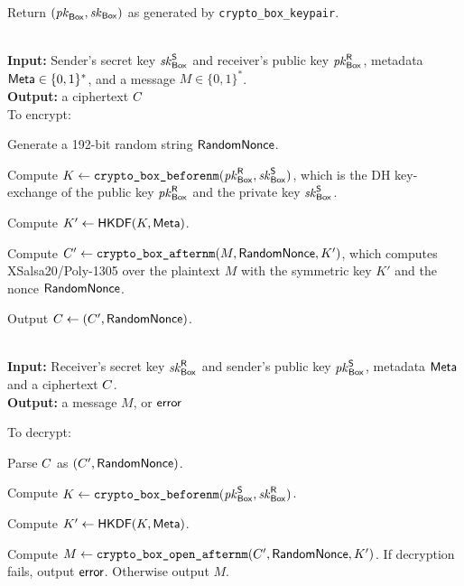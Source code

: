 \vspace{-1.5em}
\begingroup
\RaggedRight
\begin{enumerate*}
\item Return $(\mathit{pk}_{{\sf Box}}, \mathit{sk}_{{\sf Box}})$ as generated by \texttt{crypto\_box\_keypair}.
\end{enumerate*}
\endgroup


{\underline {\bf \cboxencrypt}} \\
{\bf Input:} Sender's secret key $\mathit{sk}_{{\sf Box}}^{\sf S}$ and receiver's public key $\mathit{pk}_{{\sf Box}}^{\sf R}$, metadata ${\sf Meta} \in \{0,1\}^{*}$, and a message $M \in \{0,1\}^{*}$. \\
{\bf Output:} a ciphertext $C$ \\

\vspace{-1.5em}
To encrypt:

\vspace{-1.5em}
\begingroup
\RaggedRight
\begin{enumerate*}
\item Generate a 192-bit random string ${\sf RandomNonce}$.
\item Compute $K \leftarrow \texttt{crypto\_box\_beforenm}(\mathit{pk}_{{\sf Box}}^{\sf R}, \mathit{sk}_{{\sf Box}}^{\sf S})$, which is the DH key-exchange of the public key $\mathit{pk}_{{\sf Box}}^{\sf R}$ and the private key $\mathit{sk}_{{\sf Box}}^{\sf S}$.
\item Compute $K' \leftarrow {\sf HKDF}(K, {\sf Meta})$.
\item Compute $C' \leftarrow \texttt{crypto\_box\_afternm}(M, {\sf RandomNonce}, K')$, which computes XSalsa20/Poly-1305 over the plaintext $M$ with the symmetric key $K'$ and the nonce ${\sf RandomNonce}$.
\item Output $C \leftarrow (C', {\sf RandomNonce})$.
\end{enumerate*}
\endgroup


{\underline {\bf \cboxdecrypt}} \\
{\bf Input:} Receiver's secret key $\mathit{sk}_{{\sf Box}}^{\sf R}$ and sender's public key $\mathit{pk}_{{\sf Box}}^{\sf S}$, metadata ${\sf Meta}$ and a ciphertext $C$. \\
{\bf Output:} a message $M$, or ${\sf error}$

To decrypt:

\vspace{-1em}
\begingroup
\RaggedRight
\begin{enumerate*}
\item Parse $C$ as $(C', {\sf RandomNonce})$.
\item Compute $K \leftarrow \texttt{crypto\_box\_beforenm}(\mathit{pk}_{{\sf Box}}^{\sf S}, \mathit{sk}_{{\sf Box}}^{\sf R})$.
\item Compute $K' \leftarrow {\sf HKDF}(K, {\sf Meta})$.
\item Compute $M \leftarrow \texttt{crypto\_box\_open\_afternm}(C', {\sf RandomNonce}, K')$. If decryption fails, output ${\sf error}$. Otherwise output $M$.
\end{enumerate*}
\endgroup

